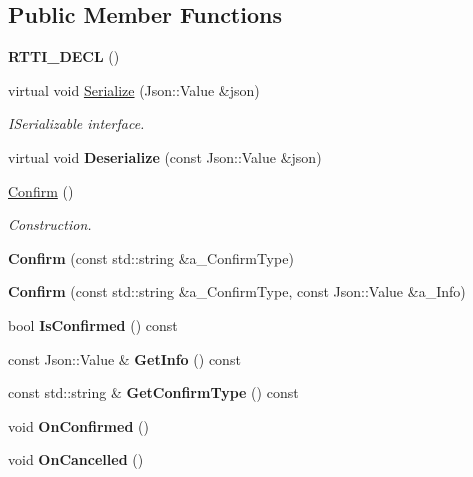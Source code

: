\subsection*{Public Member Functions}
\begin{DoxyCompactItemize}
\item 
\mbox{\label{class_confirm_afa2c80de6f252009ba1172c1084c34b9}} 
{\bfseries R\+T\+T\+I\+\_\+\+D\+E\+CL} ()
\item 
\mbox{\label{class_confirm_ad89a0e48bd631936bcebae6797ffdb4a}} 
virtual void \hyperlink{class_confirm_ad89a0e48bd631936bcebae6797ffdb4a}{Serialize} (Json\+::\+Value \&json)
\begin{DoxyCompactList}\small\item\em I\+Serializable interface. \end{DoxyCompactList}\item 
\mbox{\label{class_confirm_a462316911f464637e6a4db0948d14901}} 
virtual void {\bfseries Deserialize} (const Json\+::\+Value \&json)
\item 
\mbox{\label{class_confirm_a4ecc0c660e01c48e582602e0333f8f92}} 
\hyperlink{class_confirm_a4ecc0c660e01c48e582602e0333f8f92}{Confirm} ()
\begin{DoxyCompactList}\small\item\em Construction. \end{DoxyCompactList}\item 
\mbox{\label{class_confirm_a9231a4747138f49288ab6ad3a2c031aa}} 
{\bfseries Confirm} (const std\+::string \&a\+\_\+\+Confirm\+Type)
\item 
\mbox{\label{class_confirm_ad1f378b2556a4b379f2801a10542536d}} 
{\bfseries Confirm} (const std\+::string \&a\+\_\+\+Confirm\+Type, const Json\+::\+Value \&a\+\_\+\+Info)
\item 
\mbox{\label{class_confirm_abc920cc6480dd701fe94091306ce5463}} 
bool {\bfseries Is\+Confirmed} () const
\item 
\mbox{\label{class_confirm_afd38a32965e6872089a540358ec24ece}} 
const Json\+::\+Value \& {\bfseries Get\+Info} () const
\item 
\mbox{\label{class_confirm_a745d16c0d2eb3f12204f2227c07f4789}} 
const std\+::string \& {\bfseries Get\+Confirm\+Type} () const
\item 
\mbox{\label{class_confirm_ab24a1ed9ab498ce99abfa1c0ee515b2b}} 
void {\bfseries On\+Confirmed} ()
\item 
\mbox{\label{class_confirm_a0d8bd7e4958ebdebcf9f1a1dff28394b}} 
void {\bfseries On\+Cancelled} ()
\end{DoxyCompactItemize}
